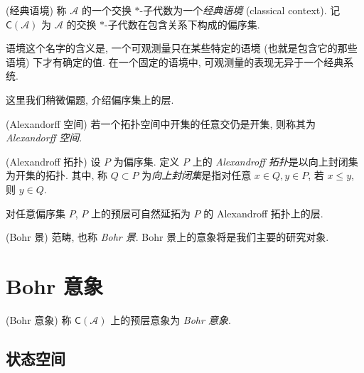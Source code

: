 \begin{definition}
    {(经典语境)}
    称 $\mathcal A$ 的一个交换 $*$-子代数为一个\emph{经典语境} (classical context).
    记 $\mathsf C(\mathcal A)$ 为 $\mathcal A$ 的交换 $*$-子代数在包含关系下构成的偏序集.
\end{definition}

\begin{remark}
    {}
    语境这个名字的含义是, 一个可观测量只在某些特定的语境 (也就是包含它的那些语境) 下才有确定的值. 在一个固定的语境中, 可观测量的表现无异于一个经典系统.
\end{remark}

这里我们稍微偏题, 介绍偏序集上的层.

\begin{definition}
    {(Alexandorff 空间)}
    若一个拓扑空间中开集的任意交仍是开集, 则称其为 \emph{Alexandorff 空间}.
\end{definition}

\begin{definition}
    {(Alexandroff 拓扑)}
    设 $P$ 为偏序集. 定义 $P$ 上的 \emph{Alexandroff 拓扑}是以向上封闭集为开集的拓扑. 其中, 称 $Q\subset P$ 为\emph{向上封闭集}是指对任意 $x\in Q,y\in P$, 若 $x\leq y$, 则 $y\in Q$.
\end{definition}

\begin{prop}
    {}
    对任意偏序集 $P$, $P$ 上的预层可自然延拓为 $P$ 的 Alexandroff 拓扑上的层.
\end{prop}


\begin{definition}
    {(Bohr 景)}
    范畴, 也称 \emph{Bohr 景}. Bohr 景上的意象将是我们主要的研究对象.
\end{definition}

\section{Bohr 意象}

\begin{definition}
    {(Bohr 意象)}
    称 $\mathsf C(\mathcal A)$ 上的预层意象为 \emph{Bohr 意象}.
\end{definition}



\subsection{状态空间}

